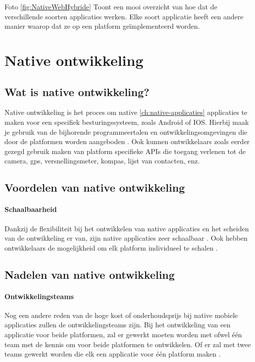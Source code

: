 Foto \ref{fig:NativeWebHybride} Toont een mooi overzicht van hoe dat de verschillende 
soorten applicaties werken. Elke soort applicatie heeft een andere manier waarop dat ze 
op een platform geïmplementeerd worden.

\section{Native ontwikkeling}
\subsection{Wat is native ontwikkeling?}\label{subsec:wat-is-native-ontwikkeling}
Native ontwikkeling is het proces om native \ref{ch:native-applicaties} applicaties te maken 
voor een specifiek besturingssysteem, zoals Android of IOS. Hierbij maak je gebruik van de 
bijhorende programmeertalen en ontwikkelingsomgevingen die door de platformen worden aangeboden 
\autocite{Meirelles2019}. Ook kunnen ontwikkelaars zoals eerder gezegd gebruik maken van 
platform specifieke APIs die toegang verlenen tot de camera, gps, versnellingsmeter, kompas, 
lijst van contacten, enz.

\subsection{Voordelen van native ontwikkeling}
\paragraph{Schaalbaarheid}
Dankzij de flexibiliteit bij het ontwikkelen van native applicaties en het scheiden van 
de ontwikkeling er van, zijn native applicaties zeer schaalbaar \autocite{Koffer2023}. 
Ook hebben ontwikkelaars de mogelijkheid om elk platform individueel te schalen \autocite{Sakovich2023}. 

\subsection{Nadelen van native ontwikkeling}
\paragraph{Ontwikkelingsteams}
Nog een andere reden van de hoge kost of onderhoudsprijs bij native mobiele applicaties 
zullen de ontwikkelingsteams zijn. Bij het ontwikkeling van een applicatie voor beide 
platformen, zal er gewerkt moeten worden met ofwel één team met de kennis om voor beide 
platformen te ontwikkelen. Of er zal met twee teams gewerkt worden die elk een applicatie 
voor één platform maken \autocite{Kotlin2023}.

